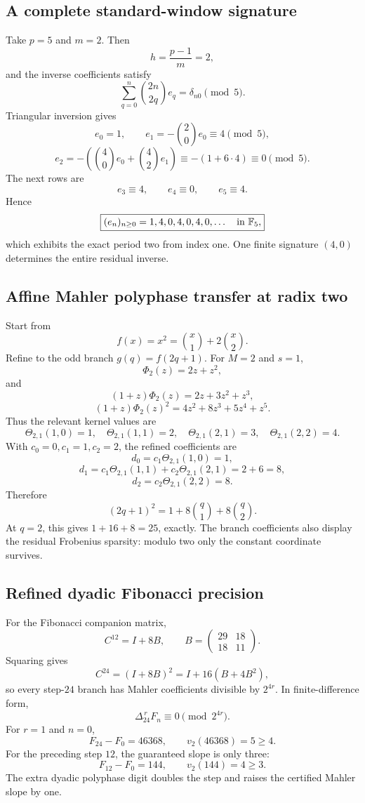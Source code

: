 \documentclass[11pt]{article}
\theoremstyle{definition}\newtheorem{definition}[theorem]{Definition}\newtheorem{example}[theorem]{Example}\newtheorem{construction}[theorem]{Construction}\newtheorem{algorithm}[theorem]{Algorithm}\newtheorem{conjecture}[theorem]{Conjecture}\newtheorem{problem}[theorem]{Problem}
\theoremstyle{remark}\newtheorem{remark}[theorem]{Remark}\newtheorem{boundary}[theorem]{Boundary}\newtheorem{certificate}[theorem]{Computational Certificate}\newtheorem{classical}[theorem]{Classical Input}\newtheorem{principle}[theorem]{Structural Principle}
\begin{document}
\subsection{A complete standard-window signature}
Take $p=5$ and $m=2$.  Then
\[
 h=\frac{p-1}{m}=2,
\]
and the inverse coefficients satisfy
\[
 \sum_{q=0}^{n}\binom{2n}{2q}e_q=\delta_{n0}\pmod5.
\]
Triangular inversion gives
\[
 e_0=1,
 \qquad
 e_1=-\binom20e_0\equiv4\pmod5,
\]
\[
 e_2=-\left(\binom40e_0+\binom42e_1\right)
      \equiv-(1+6\cdot4)\equiv0\pmod5.
\]
The next rows are
\[
 e_3\equiv4,
 \qquad e_4\equiv0,
 \qquad e_5\equiv4.
\]
Hence
\[
 \boxed{(e_n)_{n\geq0}=1,4,0,4,0,4,0,\ldots\quad\text{in }\mathbb F_5,}
\]
which exhibits the exact period two from index one.  One finite signature $(4,0)$ determines the entire residual inverse.

\subsection{Affine Mahler polyphase transfer at radix two}
Start from
\[
 f(x)=x^2=\binom x1+2\binom x2.
\]
Refine to the odd branch $g(q)=f(2q+1)$.  For $M=2$ and $s=1$,
\[
 \Phi_2(z)=2z+z^2,
\]
and
\[
 (1+z)\Phi_2(z)=2z+3z^2+z^3,
\]
\[
 (1+z)\Phi_2(z)^2=4z^2+8z^3+5z^4+z^5.
\]
Thus the relevant kernel values are
\[
 \Theta_{2,1}(1,0)=1,
 \quad
 \Theta_{2,1}(1,1)=2,
 \quad
 \Theta_{2,1}(2,1)=3,
 \quad
 \Theta_{2,1}(2,2)=4.
\]
With $c_0=0,c_1=1,c_2=2$, the refined coefficients are
\[
 d_0=c_1\Theta_{2,1}(1,0)=1,
\]
\[
 d_1=c_1\Theta_{2,1}(1,1)+c_2\Theta_{2,1}(2,1)=2+6=8,
\]
\[
 d_2=c_2\Theta_{2,1}(2,2)=8.
\]
Therefore
\[
 \boxed{(2q+1)^2=1+8\binom q1+8\binom q2.}
\]
At $q=2$, this gives $1+16+8=25$, exactly.  The branch coefficients also display the residual Frobenius sparsity: modulo two only the constant coordinate survives.

\subsection{Refined dyadic Fibonacci precision}
For the Fibonacci companion matrix,
\[
 C^{12}=I+8B,
 \qquad
 B=\begin{pmatrix}29&18\\18&11\end{pmatrix}.
\]
Squaring gives
\[
 C^{24}=(I+8B)^2=I+16(B+4B^2),
\]
so every step-$24$ branch has Mahler coefficients divisible by $2^{4r}$.  In finite-difference form,
\[
 \boxed{\Delta_{24}^{\,r}F_n\equiv0\pmod{2^{4r}}.}
\]
For $r=1$ and $n=0$,
\[
 F_{24}-F_0=46368,
 \qquad v_2(46368)=5\geq4.
\]
For the preceding step $12$, the guaranteed slope is only three:
\[
 F_{12}-F_0=144,
 \qquad v_2(144)=4\geq3.
\]
The extra dyadic polyphase digit doubles the step and raises the certified Mahler slope by one.
\end{document}

